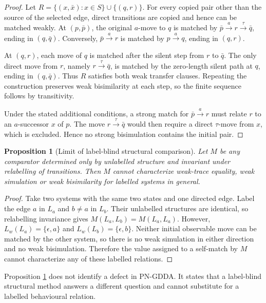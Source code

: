 \documentclass[JMCS,submit]{resources/ISRP}
\newtheorem{proposition}[theorem]{Proposition}
\theoremstyle{definition}
\theoremstyle{remark}
\numberwithin{equation}{section}
\newcommand{\TAU}{\tau}
\begin{document}
\begin{proof}
Let
$R=\{(x,\bar x):x\in S\}\cup\{(q,r)\}$. For every copied pair other than the
source of the selected edge, direct transitions are copied and hence can be
matched weakly. At $(p,\bar p)$, the original $a$-move to $q$ is matched by
$\bar p\xrightarrow{a}r\xrightarrow{\TAU}\bar q$, ending in $(q,\bar q)$.
Conversely, $\bar p\xrightarrow{a}r$ is matched by
$p\xrightarrow{a}q$, ending in $(q,r)$.

At $(q,r)$, each move of $q$ is matched after the silent step from $r$ to
$\bar q$. The only direct move from $r$, namely $r\xrightarrow{\TAU}\bar q$,
is matched by the zero-length silent path at $q$, ending in $(q,\bar q)$. Thus
$R$ satisfies both weak transfer clauses. Repeating the construction preserves
weak bisimilarity at each step, so the finite sequence follows by transitivity.

Under the stated additional conditions, a strong match for
$\bar p\xrightarrow{a}r$ must relate $r$ to an $a$-successor $x$ of $p$. The
move $r\xrightarrow{\TAU}\bar q$ would then require a direct $\TAU$-move from
$x$, which is excluded. Hence no strong bisimulation contains the initial pair.
\end{proof}

\begin{proposition}[Limit of label-blind structural comparison]
\label{prop:label-blind}
Let $M$ be any comparator determined only by unlabelled structure and invariant
under relabelling of transitions. Then $M$ cannot characterize weak-trace
equality, weak simulation or weak bisimilarity for labelled systems in general.
\end{proposition}

\begin{proof}
Take two systems with the same two states and one directed edge. Label the edge
$a$ in $L_a$ and $b\neq a$ in $L_b$. Their unlabelled structures are identical,
so relabelling invariance gives $M(L_a,L_b)=M(L_a,L_a)$. However,
$L_w(L_a)=\{\epsilon,a\}$ and $L_w(L_b)=\{\epsilon,b\}$. Neither initial
observable move can be matched by the other system, so there is no weak simulation
in either direction and no weak bisimulation. Therefore the value assigned to a
self-match by $M$ cannot characterize any of these labelled relations.
\end{proof}

Proposition \ref{prop:label-blind} does not identify a defect in PN-GDDA. It
states that a label-blind structural method answers a different question and
cannot substitute for a labelled behavioural relation.
\end{document}
